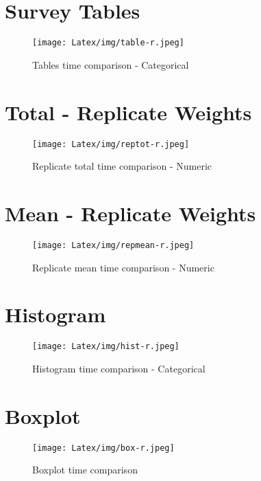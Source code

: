 \section{Survey Tables}
\begin{figure}[H]
   \centering
    \texttt{[image: Latex/img/table-r.jpeg]}
    \caption{Tables time comparison - Categorical}
    \label{fig:table-r}
\end{figure}




\section{Total - Replicate Weights}
\begin{figure}[H]
  \centering
    \texttt{[image: Latex/img/reptot-r.jpeg]}
    \caption{Replicate total time comparison - Numeric}
    \label{fig:reptot-r}
\end{figure}
\section{Mean - Replicate Weights}
\begin{figure}[H]
  \centering
    \texttt{[image: Latex/img/repmean-r.jpeg]}
    \caption{Replicate mean time comparison - Numeric}
    \label{fig:repmean-r}
\end{figure}



\section{Histogram}
\begin{figure}[H]
   \centering
    \texttt{[image: Latex/img/hist-r.jpeg]}
    \caption{Histogram time comparison - Categorical}
    \label{fig:hist-r}
\end{figure}
\section{Boxplot}
\begin{figure}[H]
   \centering
    \texttt{[image: Latex/img/box-r.jpeg]}
    \caption{Boxplot time comparison}
    \label{fig:box-r}
\end{figure}

